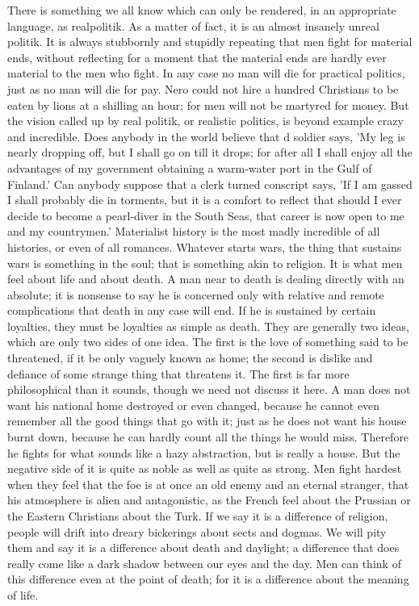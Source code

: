 There is something we all know which can only be rendered, in an appropriate language, as realpolitik. As a matter of fact, it is an almost insanely unreal politik. It is always stubbornly and stupidly repeating that men fight for material ends, without reflecting for a moment that the material ends are hardly ever material to the men who fight. In any case no man will die for practical politics, just as no man will die for pay. Nero could not hire a hundred Christians to be eaten by lions at a shilling an hour; for men will not be martyred for money. But the vision called up by real politik, or realistic politics, is beyond example crazy and incredible. Does anybody in the world believe that d soldier says, 'My leg is nearly dropping off, but I shall go on till it drops; for after all I shall enjoy all the advantages of my government obtaining a warm-water port in the Gulf of Finland.' Can anybody suppose that a clerk turned conscript says, 'If I am gassed I shall probably die in torments, but it is a comfort to reflect that should I ever decide to become a pearl-diver in the South Seas, that career is now open to me and my countrymen.' Materialist history is the most madly incredible of all histories, or even of all romances. Whatever starts wars, the thing that sustains wars is something in the soul; that is something akin to religion. It is what men feel about life and about death. A man near to death is dealing directly with an absolute; it is nonsense to say he is concerned only with relative and remote complications that death in any case will end. If he is sustained by certain loyalties, they must be loyalties as simple as death. They are generally two ideas, which are only two sides of one idea. The first is the love of something said to be threatened, if it be only vaguely known as home; the second is dislike and defiance of some strange thing that threatens it. The first is far more philosophical than it sounds, though we need not discuss it here. A man does not want his national home destroyed or even changed, because he cannot even remember all the good things that go with it; just as he does not want his house burnt down, because he can hardly count all the things he would miss. Therefore he fights for what sounds like a hazy abstraction, but is really a house. But the negative side of it is quite as noble as well as quite as strong. Men fight hardest when they feel that the foe is at once an old enemy and an eternal stranger, that his atmosphere is alien and antagonistic, as the French feel about the Prussian or the Eastern Christians about the Turk. If we say it is a difference of religion, people will drift into dreary bickerings about sects and dogmas. We will pity them and say it is a difference about death and daylight; a difference that does really come like a dark shadow between our eyes and the day. Men can think of this difference even at the point of death; for it is a difference about the meaning of life.

